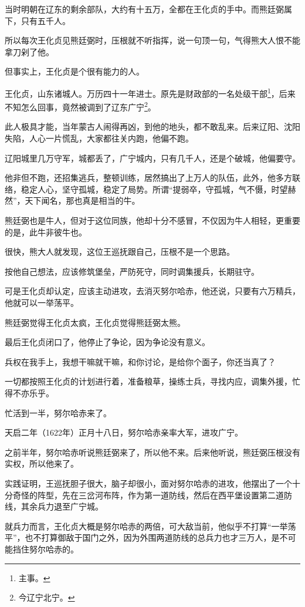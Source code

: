\begin{multicols}{\theparacolNo}
		当时明朝在辽东的剩余部队，大约有十五万，全都在王化贞的手中。而熊廷弼属下，只有五千人。

		所以每次王化贞见熊廷弼时，压根就不听指挥，说一句顶一句，气得熊大人恨不能拿刀剁了他。

		但事实上，王化贞是个很有能力的人。

		王化贞，山东诸城人。万历四十一年进士。原先是财政部的一名处级干部\footnote{主事。}，后来不知怎么回事，竟然被调到了辽东广宁\footnote{今辽宁北宁。}。

		此人极具才能，当年蒙古人闹得再凶，到他的地头，都不敢乱来。后来辽阳、沈阳失陷，人心一片慌乱，大家都往关内跑，他偏不跑。

		辽阳城里几万守军，城都丢了，广宁城内，只有几千人，还是个破城，他偏要守。

		他非但不跑，还招集逃兵，整顿训练，居然搞出了上万人的队伍，此外，他多方联络，稳定人心，坚守孤城，稳定了局势。所谓“提弱卒，守孤城，气不慑，时望赫然”，天下闻名，那也真是相当的牛。

		熊廷弼也是牛人，但对于这位同族，他却十分不感冒，不仅因为牛人相轻，更重要的是，此牛非彼牛也。

		很快，熊大人就发现，这位王巡抚跟自己，压根不是一个思路。

		按他自己想法，应该修筑堡垒，严防死守，同时调集援兵，长期驻守。

		可是王化贞却认定，应该主动进攻，去消灭努尔哈赤，他还说，只要有六万精兵，他就可以一举荡平。

		熊廷弼觉得王化贞太疯，王化贞觉得熊廷弼太熊。

		最后王化贞闭口了，他停止了争论，因为争论没有意义。

		兵权在我手上，我想干嘛就干嘛，和你讨论，是给你个面子，你还当真了？

		一切都按照王化贞的计划进行着，准备粮草，操练士兵，寻找内应，调集外援，忙得不亦乐乎。

		忙活到一半，努尔哈赤来了。

		天启二年（1622年）正月十八日，努尔哈赤亲率大军，进攻广宁。

		之前半年，努尔哈赤听说熊廷弼来了，所以他不来。后来他听说，熊廷弼压根没有实权，所以他来了。

		实践证明，王巡抚胆子很大，脑子却很小，面对努尔哈赤的进攻，他摆出了一个十分奇怪的阵型，先在三岔河布阵，作为第一道防线，然后在西平堡设置第二道防线，其余兵力退至广宁城。

		就兵力而言，王化贞大概是努尔哈赤的两倍，可大敌当前，他似乎不打算“一举荡平”，也不打算御敌于国门之外，因为外围两道防线的总兵力也才三万人，是不可能挡住努尔哈赤的。


\end{multicols}
